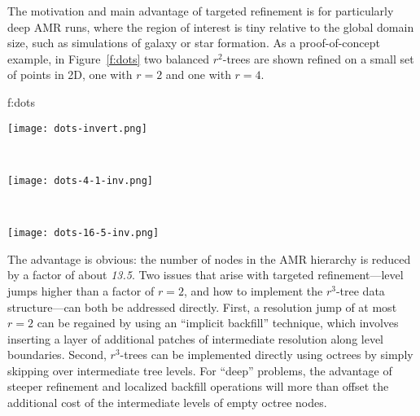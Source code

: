 \documentclass[11pt,letterpaper]{article}
\begin{document}
The motivation and main advantage of targeted refinement is for
particularly deep AMR runs, where the region of interest is tiny
relative to the global domain size, such as simulations of galaxy or
star formation.  As a proof-of-concept example, in Figure~\ref{f:dots}
two balanced $r^2$-trees are shown refined on a small set of points in 2D, one
with $r=2$ and one with $r=4$.


{f:dots}{
\begin{minipage}{\textwidth}
\begin{center}
\begin{minipage}{2.0in}
\texttt{[image: dots-invert.png]}
\end{minipage} \ 
\begin{minipage}{2.0in}
\texttt{[image: dots-4-1-inv.png]}
\end{minipage} \ 
\begin{minipage}{2.0in}
\texttt{[image: dots-16-5-inv.png]}
\end{minipage}
\end{center}
\end{minipage}}

The advantage is obvious: the number of nodes in the AMR hierarchy is
reduced by a factor of about \textit{13.5}.  Two issues that arise
with targeted refinement---level jumps higher than a factor of $r=2$,
and how to implement the $r^3$-tree data structure---can both be
addressed directly.  First, a resolution jump of at most $r=2$ can be
regained by using an ``implicit backfill'' technique, which involves
inserting a layer of additional patches of intermediate resolution
along level boundaries.  Second, $r^3$-trees can be implemented
directly using octrees by simply skipping over intermediate tree
levels.  For ``deep'' problems, the advantage of steeper refinement
and localized backfill operations will more than offset the additional
cost of the intermediate levels of empty octree nodes.
\end{document}
